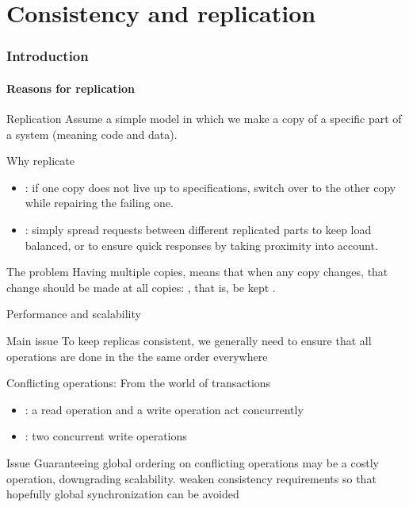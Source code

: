 \part{Consistency and replication}
\section{Introduction}
\subsection{Reasons for replication}
\begin{slide}{Replication}
    Assume a simple model in which we make a copy of a 
    specific part of a system (meaning code and data).
  \begin{block}{Why replicate}
    \begin{itemize}\tightlist
    \item {}: if one copy does not live up to specifications, switch over to the other
      copy while repairing the failing one.
    \item {}: simply spread requests between different replicated parts to keep load balanced,
      or to ensure quick responses by taking proximity into account.
    \end{itemize}
  \end{block}  
  \begin{alertblock}{The problem}
    Having multiple copies, means that when any copy changes, that change should be made at all copies:
    , that is, be kept .
  \end{alertblock}
\end{slide}

\begin{slide}{Performance and scalability}
  \begin{block}{Main issue} 
    To keep replicas consistent, we generally need to ensure that all  operations are done
    in the the same order everywhere
  \end{block}
  \begin{block}{Conflicting operations: From the world of transactions}
    \begin{itemize}\tightlist
    \item {}: a read operation and a write operation act concurrently
    \item {}: two concurrent write operations
    \end{itemize}
  \end{block}
  \begin{block}{Issue}
    Guaranteeing global ordering on conflicting operations may be a costly operation, downgrading scalability.
     weaken consistency requirements so that hopefully global synchronization can be avoided
  \end{block}
\end{slide}
